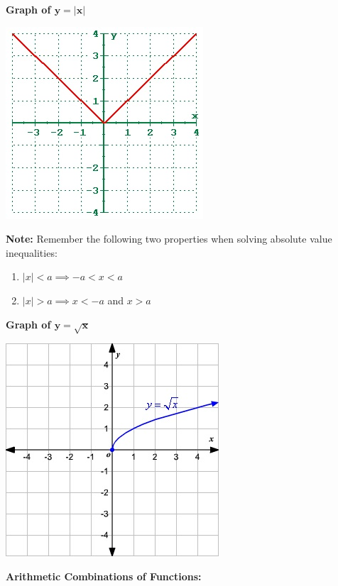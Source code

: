 \documentclass[12pt]{article}
\begin{document}
\textbf{Graph of $\mathbf{y=|x|}$}

\includegraphics{AbsoluteValue.jpg}

\textbf{Note:} Remember the following two properties when solving absolute value inequalities:

\begin{enumerate}
\item $|x| < a \implies -a < x < a$
\item $|x| > a \implies x<-a$ and  $x>a$
\end{enumerate}

\textbf{Graph of $\mathbf{y=\sqrt{x}}$}

\includegraphics{SquareRoot.jpg}

\textbf{Arithmetic Combinations of Functions:}
\end{document}
